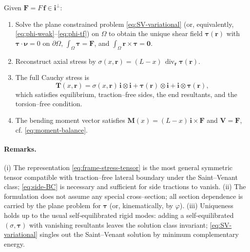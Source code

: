 Given $\bm{F}=F\,\bm{f}\in\mathbf{i}^\perp$:

\begin{enumerate}
\item Solve the plane constrained problem \eqref{eq:SV-variational} (or, equivalently, \eqref{eq:phi-weak}–\eqref{eq:phi-tf}) on $\Omega$ to obtain the unique shear field $\bm{\tau}(\bm{r})$ with $\bm{\tau}\cdot\bm{\nu}=0$ on $\partial\Omega$, $\int_\Omega\bm{\tau}=\bm{F}$, and $\int_\Omega\bm{r}\times\bm{\tau}=\mathbf{0}$.

\item Reconstruct axial stress by $\sigma(x,\bm{r})=(L-x)\,\operatorname{div}_{\bm{r}}\bm{\tau}(\bm{r})$.

\item The full Cauchy stress is
\[
\bm{T}(x,\bm{r})=\sigma(x,\bm{r})\,\mathbf{i}\otimes\mathbf{i}
+\bm{\tau}(\bm{r})\otimes\mathbf{i}
+\mathbf{i}\otimes\bm{\tau}(\bm{r}),
\]
which satisfies equilibrium, traction–free sides, the end resultants, and the torsion–free condition.

\item The bending moment vector satisfies $\bm{M}(x)=(L-x)\,\mathbf{i}\times\bm{F}$ and $\bm{V}=\bm{F}$, cf. \eqref{eq:moment-balance}.
\end{enumerate}

\paragraph{Remarks.}
(i) The representation \eqref{eq:frame-stress-tensor} is the most general symmetric tensor compatible with traction–free lateral boundary under the Saint–Venant class; \eqref{eq:side-BC} is necessary and sufficient for side tractions to vanish.
(ii) The formulation does not assume any special cross–section; all section dependence is carried by the plane problem for $\bm{\tau}$ (or, kinematically, by $\varphi$).
(iii) Uniqueness holds up to the usual self‐equilibrated rigid modes: adding a self‐equilibrated $(\sigma,\bm{\tau})$ with vanishing resultants leaves the solution class invariant; \eqref{eq:SV-variational} singles out the Saint–Venant solution by minimum complementary energy.
